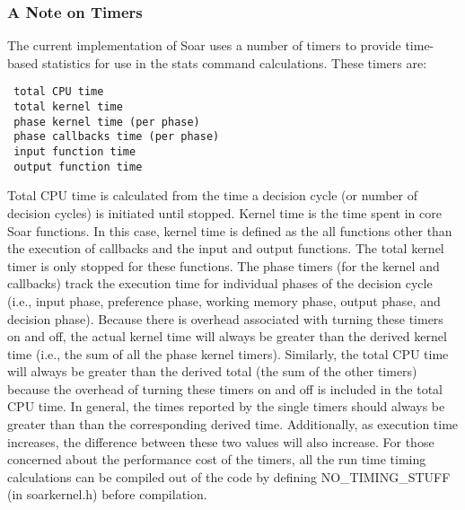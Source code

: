 \subsubsection*{A Note on Timers}
The current implementation of Soar uses a number of timers to provide time-based statistics for use in the stats command calculations. These timers are:
\begin{verbatim}
 total CPU time
 total kernel time
 phase kernel time (per phase)
 phase callbacks time (per phase)
 input function time
 output function time
\end{verbatim}
Total CPU time is calculated from the time a decision cycle (or number of decision cycles) is initiated until stopped. Kernel time is the time spent in core Soar functions. 
In this case, kernel time is defined as the all functions other than the execution of callbacks and the input and output functions. The total kernel timer is only stopped for these functions.
The phase timers (for the kernel and callbacks) track the execution time for individual phases of the decision cycle (i.e., input phase, preference phase, working memory phase, output phase, 
and decision phase). Because there is overhead associated with turning these timers on and off, the actual kernel time will always be greater than the derived kernel time (i.e., the sum of all the phase
kernel timers). Similarly, the total CPU time will always be greater than the derived total (the sum of the other timers) because the overhead of turning these timers on and off is included in the total 
CPU time. In general, the times reported by the single timers should always be greater than than the corresponding derived time. Additionally, as execution time increases, the difference between these 
two values will also increase. For those concerned about the performance cost of the timers, all the run time timing calculations can be compiled out of the code by defining NO\_TIMING\_STUFF (in soarkernel.h)
before compilation. 
